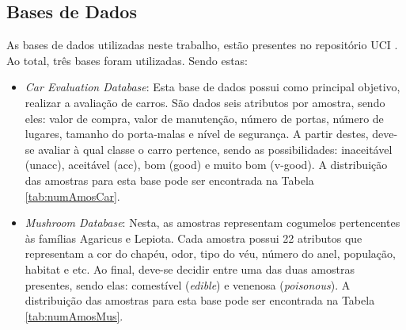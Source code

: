 \documentclass[12pt]{article}
\begin{document}
    \subsection{Bases de Dados}
        As bases de dados utilizadas neste trabalho, estão presentes no repositório UCI \cite{Dua:2017}. Ao total, três bases foram utilizadas. Sendo estas:
        
        \begin{itemize}
            \item \textit{Car Evaluation Database}: Esta base de dados possui como principal objetivo, realizar a avaliação de carros. São dados seis atributos por amostra, sendo eles: valor de compra, valor de manutenção, número de portas, número de lugares, tamanho do porta-malas e nível de segurança. A partir destes, deve-se avaliar à qual classe o carro pertence, sendo as possibilidades: inaceitável (unacc), aceitável (acc), bom (good) e muito bom (v-good). A distribuição das amostras para esta base pode ser encontrada na Tabela \ref{tab:numAmosCar}.
            
                \begin{table}[h]
                    \centering
                    \caption{Quantidade de amostras por classe da base de dados "Car Evaluation Database".}
                    \label{tab:numAmosCar}
                \end{table}
            
            \item \textit{Mushroom Database}: Nesta, as amostras representam cogumelos pertencentes às famílias Agaricus e Lepiota. Cada amostra possui 22 atributos que representam a cor do chapéu, odor, tipo do véu, número do anel, população, habitat e etc. Ao final, deve-se decidir entre uma das duas amostras presentes, sendo elas: comestível (\textit{edible}) e venenosa (\textit{poisonous}). A distribuição das amostras para esta base pode ser encontrada na Tabela \ref{tab:numAmosMus}.
            

\end{itemize}
\end{document}
